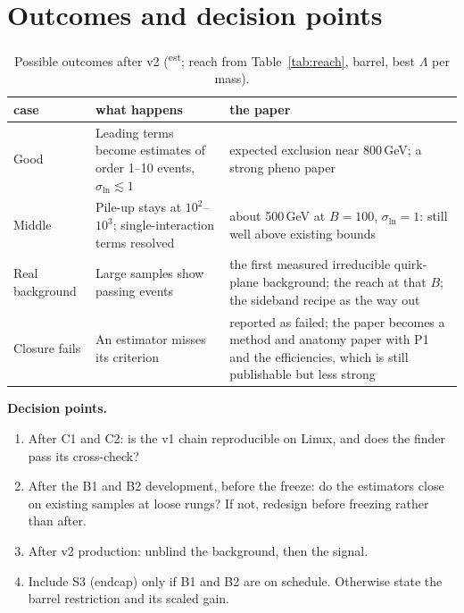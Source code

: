 \documentclass[11pt,a4paper]{article}
\newcommand{\EST}{\textsuperscript{\textsf{est}}}
\begin{document}
\section{Outcomes and decision points}
\begin{table}[h]
\centering\small
\caption{Possible outcomes after v2 (\EST; reach from Table~\ref{tab:reach}, barrel, best $\Lambda$ per mass).}
\begin{tabularx}{\linewidth}{@{}P{30mm}P{62mm}L@{}}
\toprule
case & what happens & the paper\\
\midrule
Good & Leading terms become estimates of order 1--10 events, $\sigma_{\ln}\lesssim1$ & expected exclusion near 800\,GeV;
a strong pheno paper\\
Middle & Pile-up stays at $10^2$--$10^3$; single-interaction terms resolved & about 500\,GeV at $B=100$, $\sigma_{\ln}=1$:
still well above existing bounds\\
Real background & Large samples show passing events & the first measured irreducible quirk-plane background; the
reach at that $B$; the sideband recipe as the way out\\
Closure fails & An estimator misses its criterion & reported as failed; the paper becomes a method and anatomy paper
with P1 and the efficiencies, which is still publishable but less strong\\
\bottomrule
\end{tabularx}
\end{table}

\textbf{Decision points.}
\begin{enumerate}
  \item After C1 and C2: is the v1 chain reproducible on Linux, and does the finder pass its cross-check?
  \item After the B1 and B2 development, before the freeze: do the estimators close on existing samples at loose rungs? If
        not, redesign before freezing rather than after.
  \item After v2 production: unblind the background, then the signal.
  \item Include S3 (endcap) only if B1 and B2 are on schedule. Otherwise state the barrel restriction and its scaled gain.
\end{enumerate}

\end{document}
